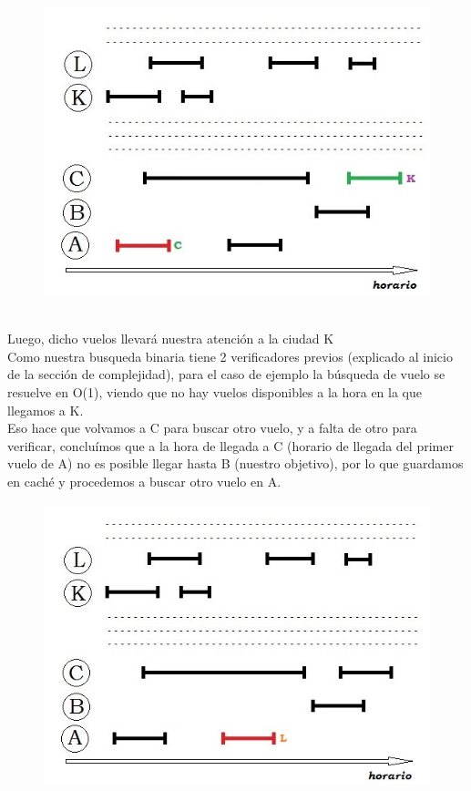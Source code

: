 \documentclass[10pt,a4paper]{article}
\begin{document}
\begin{figure}[h]
	\begin{center}
	   \includegraphics[scale=0.50]{imagenes/demo5.jpg}
	\end{center}
\end{figure}\\
Luego, dicho vuelos llevará nuestra atención a la ciudad K\\ Como nuestra busqueda binaria tiene 2 verificadores previos (explicado al inicio de la sección de complejidad), para el caso de ejemplo la búsqueda de vuelo se resuelve en O(1), viendo que no hay vuelos disponibles a la hora en la que llegamos a K.\\
Eso hace que volvamos a C para buscar otro vuelo, y a falta de otro para verificar, concluímos que a la hora de llegada a C (horario de llegada del primer vuelo de A) no es posible llegar hasta B (nuestro objetivo), por lo que guardamos en caché y procedemos a buscar otro vuelo en A.
\begin{figure}[h]
	\begin{center}
	   \includegraphics[scale=0.50]{imagenes/demo6.jpg}
	\end{center}
\end{figure}\\
\end{document}
